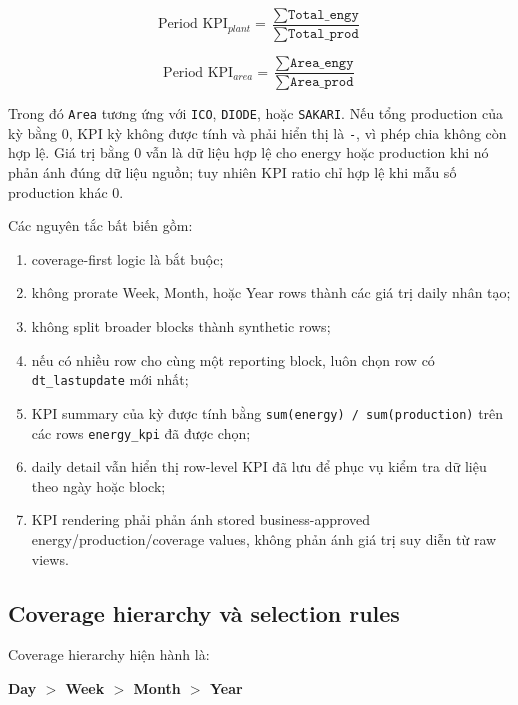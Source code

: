 \begin{equation}
	\text{Period KPI}_{plant} =
	\frac{\sum \texttt{Total\_engy}}{\sum \texttt{Total\_prod}}
	\label{eq:kpi_period_plant}
\end{equation}

\begin{equation}
	\text{Period KPI}_{area} =
	\frac{\sum \texttt{Area\_engy}}{\sum \texttt{Area\_prod}}
	\label{eq:kpi_period_area}
\end{equation}

Trong đó \texttt{Area} tương ứng với \texttt{ICO}, \texttt{DIODE}, hoặc \texttt{SAKARI}. Nếu tổng production của kỳ bằng 0, KPI kỳ không được tính và phải hiển thị là \texttt{-}, vì phép chia không còn hợp lệ. Giá trị bằng 0 vẫn là dữ liệu hợp lệ cho energy hoặc production khi nó phản ánh đúng dữ liệu nguồn; tuy nhiên KPI ratio chỉ hợp lệ khi mẫu số production khác 0.

Các nguyên tắc bất biến gồm:

\begin{enumerate}[label=-]
\item coverage-first logic là bắt buộc;
\item không prorate Week, Month, hoặc Year rows thành các giá trị daily nhân tạo;
\item không split broader blocks thành synthetic rows;
\item nếu có nhiều row cho cùng một reporting block, luôn chọn row có \texttt{dt\_lastupdate} mới nhất;
\item KPI summary của kỳ được tính bằng \texttt{sum(energy) / sum(production)} trên các rows \texttt{energy\_kpi} đã được chọn;
\item daily detail vẫn hiển thị row-level KPI đã lưu để phục vụ kiểm tra dữ liệu theo ngày hoặc block;
\item KPI rendering phải phản ánh stored business-approved energy/production/coverage values, không phản ánh giá trị suy diễn từ raw views.
\end{enumerate}

\subsection{Coverage hierarchy và selection rules}

Coverage hierarchy hiện hành là:

\begin{center}
	\textbf{Day $>$ Week $>$ Month $>$ Year}
\end{center}


